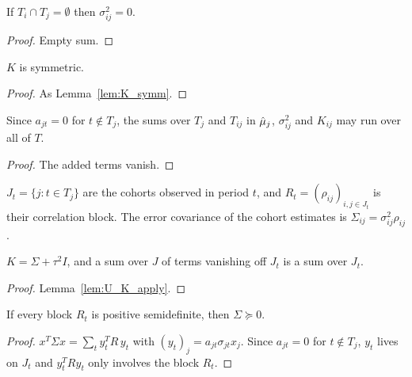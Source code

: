 \begin{lemma}\label{lem:U_disjoint}
  \leanok
  If $T_i \cap T_j = \emptyset$ then $\sigma^2_{ij} = 0$.
\end{lemma}
\begin{proof}
  \leanok
  Empty sum.
\end{proof}

\begin{lemma}\label{lem:U_K_symm}
  \leanok
  $K$ is symmetric.
\end{lemma}
\begin{proof}
  \leanok
  As Lemma~\ref{lem:K_symm}.
\end{proof}

\begin{lemma}\label{lem:U_sum_full}
  \leanok
  Since $a_{jt} = 0$ for $t \notin T_j$, the sums over $T_j$ and $T_{ij}$ in
  $\hat\mu_j$, $\sigma^2_{ij}$ and $K_{ij}$ may run over all of $T$.
\end{lemma}
\begin{proof}
  \leanok
  The added terms vanish.
\end{proof}

\begin{definition}\label{def:U_errCov}
  \leanok
  $J_t = \{j : t \in T_j\}$ are the cohorts observed in period $t$, and
  $R_t = (\rho_{ij})_{i,j\in J_t}$ is their correlation block. The error
  covariance of the cohort estimates is $\Sigma_{ij} = \sigma^2_{ij}\rho_{ij}$.
\end{definition}

\begin{lemma}[$K = \Sigma + \tau^2 I$]\label{lem:U_K_eq_errCov}
  \leanok
  $K = \Sigma + \tau^2 I$, and a sum over $J$ of terms vanishing off $J_t$ is a
  sum over $J_t$.
\end{lemma}
\begin{proof}
  \leanok
  Lemma~\ref{lem:U_K_apply}.
\end{proof}

\begin{lemma}\label{lem:U_errCov_posSemidef}
  \leanok
  If every block $R_t$ is positive semidefinite, then $\Sigma \succeq 0$.
\end{lemma}
\begin{proof}
  \leanok
  $x^T\Sigma x = \sum_t y_t^T R\,y_t$ with $(y_t)_j = a_{jt}\sigma_{jt}x_j$. Since
  $a_{jt} = 0$ for $t \notin T_j$, $y_t$ lives on $J_t$ and $y_t^TRy_t$ only
  involves the block $R_t$.
\end{proof}

